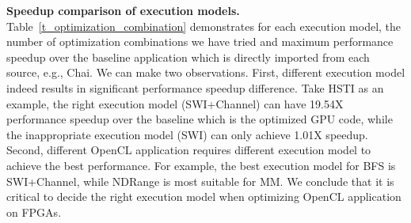 {\bf Speedup comparison of execution models. }
Table~\ref{t_optimization_combination} demonstrates for each execution model, the number of optimization combinations we have tried and maximum performance speedup over the baseline application which is directly imported from each source, e.g., Chai. 
We can make two observations. First, different execution model indeed results in significant performance speedup difference. Take HSTI as an example, the right execution model (SWI+Channel) can have 19.54X performance speedup over the baseline which is the optimized GPU code, while the inappropriate execution model (SWI) can only achieve 1.01X speedup. Second, different OpenCL application requires different execution model to achieve the best performance. For example, the best execution model for BFS is SWI+Channel, while NDRange is most suitable for MM. We conclude that it is critical to decide the right execution model when optimizing OpenCL application on FPGAs.  

%			
%			
%			


